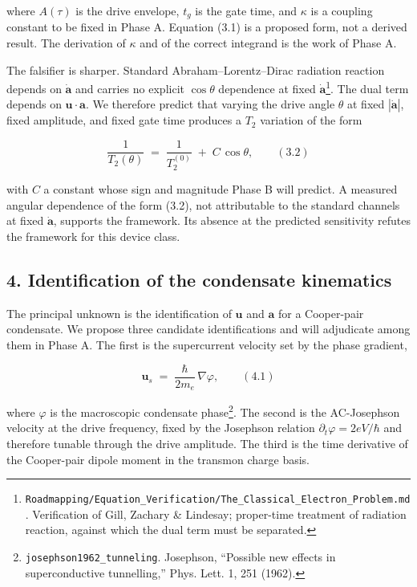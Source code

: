 \documentclass[
  11pt,
]{article}
\begin{document}
where \(A(\tau)\) is the drive envelope, \(t_g\) is the gate time, and
\(\kappa\) is a coupling constant to be fixed in Phase A. Equation (3.1)
is a proposed form, not a derived result. The derivation of \(\kappa\)
and of the correct integrand is the work of Phase A.

The falsifier is sharper. Standard Abraham--Lorentz--Dirac radiation
reaction depends on \(\dot{\mathbf{a}}\) and carries no explicit
\(\cos\theta\) dependence at fixed \(\dot{\mathbf{a}}\)\footnote{\texttt{Roadmapping/Equation\_Verification/The\_Classical\_Electron\_Problem.md}.
  Verification of Gill, Zachary \& Lindesay; proper-time treatment of
  radiation reaction, against which the dual term must be separated.}.
The dual term depends on \(\mathbf{u}\!\cdot\!\mathbf{a}\). We therefore
predict that varying the drive angle \(\theta\) at fixed
\(|\dot{\mathbf{a}}|\), fixed amplitude, and fixed gate time produces a
\(T_2\) variation of the form

\[
\frac{1}{T_2(\theta)} \;=\; \frac{1}{T_2^{(0)}} \;+\; C\,\cos\theta, \qquad (3.2)
\]

with \(C\) a constant whose sign and magnitude Phase B will predict. A
measured angular dependence of the form (3.2), not attributable to the
standard channels at fixed \(\dot{\mathbf{a}}\), supports the framework.
Its absence at the predicted sensitivity refutes the framework for this
device class.

\hypertarget{identification-of-the-condensate-kinematics}{%
\subsection{4. Identification of the condensate
kinematics}\label{identification-of-the-condensate-kinematics}}

The principal unknown is the identification of \(\mathbf{u}\) and
\(\mathbf{a}\) for a Cooper-pair condensate. We propose three candidate
identifications and will adjudicate among them in Phase A. The first is
the supercurrent velocity set by the phase gradient,

\[
\mathbf{u}_s \;=\; \frac{\hbar}{2 m_e}\,\nabla\varphi, \qquad (4.1)
\]

where \(\varphi\) is the macroscopic condensate phase\footnote{\texttt{josephson1962\_tunneling}.
  Josephson, ``Possible new effects in superconductive tunnelling,''
  Phys. Lett. 1, 251 (1962).}. The second is the AC-Josephson velocity
at the drive frequency, fixed by the Josephson relation
\(\partial_t\varphi = 2eV/\hbar\) and therefore tunable through the
drive amplitude. The third is the time derivative of the Cooper-pair
dipole moment in the transmon charge basis.
\end{document}
